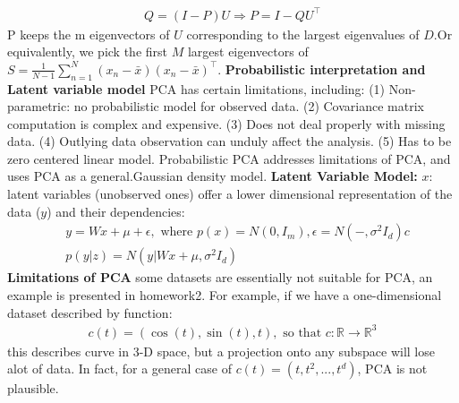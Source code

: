 \documentclass[11pt]{article}
\theoremstyle{plain}
\theoremstyle{definition}
\begin{document}
\begin{align*}
Q = (I-P)U \Longrightarrow P = I - QU^\top
\end{align*}
P keeps the m eigenvectors of $U$ corresponding to the largest eigenvalues of $D$.Or equivalently, we pick the first $M$ largest eigenvectors of $S = \frac{1}{N-1} \sum\limits_{n=1}^{N}(x_n - \bar{x})(x_n-\bar{x})^\top$.\newline 
\vspace{10mm}
\textbf{Probabilistic interpretation and Latent variable model}\newline 
\vspace{5mm}
PCA has certain limitations, including: \newline 
(1) Non-parametric: no probabilistic model for observed data.  \newline 
(2) Covariance matrix computation is complex and expensive. \newline 
(3) Does not deal properly with missing data. \newline 
(4) Outlying data observation can unduly affect the analysis.\newline 
(5) Has to be zero centered linear model.\newline 
\vspace{5mm} 
Probabilistic PCA addresses limitations of PCA, and uses PCA as a general.\newline  Gaussian density model. \newline 
\vspace{10mm}
\textbf{Latent Variable Model: } $x$: latent variables (unobserved ones) offer a lower dimensional representation of the data ($y$) and their dependencies: 
\begin{align*}
&y = Wx + \mu + \epsilon, \text{ where } p(x) = N(0, I_m), \epsilon = N(-, \sigma^2 I_d)c\\
&p(y|z) = N(y | Wx + \mu, \sigma^2 I_d)  
\end{align*} \newline 
\vspace{10mm}
\textbf{Limitations of PCA}\newline 
some datasets are essentially not suitable for PCA, an example is presented in homework2. For example, if we have a one-dimensional dataset described by function: \begin{align*}
c(t) = (\cos(t), \sin(t), t), \text{  so that  } c:\mathbb{R} \rightarrow \mathbb{R}^3
\end{align*}
this describes curve in 3-D space, but a projection onto any subspace will lose alot of data. In fact, for a general case of $c(t) = (t, t^2, ..., t^d)$, PCA is not plausible. \newline 
\end{document}
